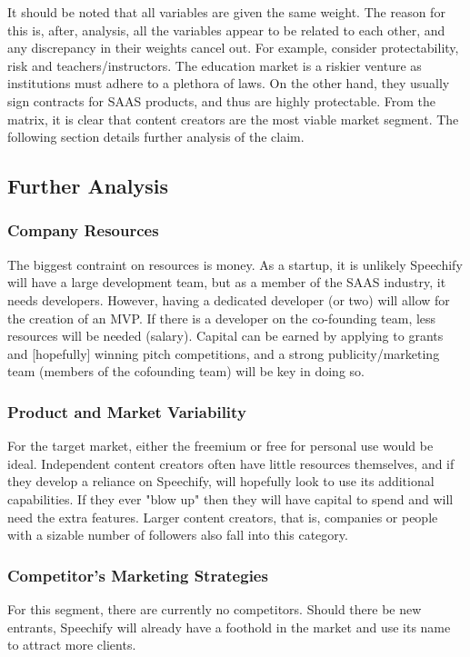 \documentclass[letterpaper]{article}
\begin{document}
        \par
        It should be noted that all variables are given the same weight. The reason for this is, after, analysis, all the variables appear to be related to each other, and any discrepancy in their weights cancel out. For example, consider protectability, risk and teachers/instructors. The education market is a riskier venture as institutions must adhere to a plethora of laws. On the other hand, they usually sign contracts for SAAS products, and thus are highly protectable. From the matrix, it is clear that content creators are the most viable market segment. The following section details further analysis of the claim.
    \subsection{Further Analysis}
        \subsubsection{Company Resources}
            The biggest contraint on resources is money. As a startup, it is unlikely Speechify will have a large development team, but as a member of the SAAS industry, it needs developers. However, having a dedicated developer (or two) will allow for the creation of an MVP. If there is a developer on the co-founding team, less resources will be needed (salary). Capital can be earned by applying to grants and [hopefully] winning pitch competitions, and a strong publicity/marketing team (members of the cofounding team) will be key in doing so.
        \subsubsection{Product and Market Variability}
            For the target market, either the freemium or free for personal use would be ideal. Independent content creators often have little resources themselves, and if they develop a reliance on Speechify, will hopefully look to use its additional capabilities. If they ever "blow up" then they will have capital to spend and will need the extra features. Larger content creators, that is, companies or people with a sizable number of followers also fall into this category.
        \subsubsection{Competitor's Marketing Strategies}
            For this segment, there are currently no competitors. Should there be new entrants, Speechify will already have a foothold in the market and use its name to attract more clients.
        
\end{document}
